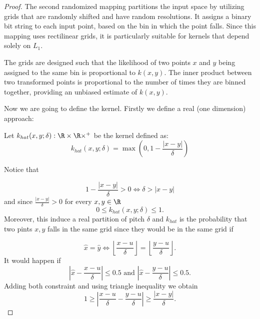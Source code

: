 \begin{proof}
The second randomized mapping partitions the input space by utilizing grids that are randomly shifted and have random resolutions. It assigns a binary bit string to each input point, based on the bin in which the point falls. Since this mapping uses rectilinear grids, it is particularly suitable for kernels that depend solely on $L_1$.

The grids are designed such that the likelihood of two points $x$ and $y$ being assigned to the same bin is proportional to $k(x,y)$. The inner product between two transformed points is proportional to the number of times they are binned together, providing an unbiased estimate of $k(x,y)$.


Now we are going to define the kernel. Firstly we define a real (one dimension) approach: 

Let  $k_{hat}(x, y; \delta) : \R \times \R \times ^+$ be the kernel defined as: 
\begin{equation}
    k_{hat}(x, y; \delta)
    = 
    \max 
    \left(
    0,
    1 - \frac{|x-y|}{\delta}
    \right)  
\end{equation}

Notice that 

\begin{equation}
    1 - \frac{|x-y|}{\delta} > 0
    \Leftrightarrow
    \delta > |x-y |
\end{equation}
and since $\frac{|x-y|}{\delta} > 0$ for every $x,y \in \R$
\begin{equation}
     0 \leq k_{hat}(x, y; \delta) \leq 1.
\end{equation} 
Moreover, this induce a real partition of pitch $\delta$ and $k_{hat}$ is the probability that two pints $x,y$ falls in the same grid since 
they would be in the same grid if 

\begin{equation}
 \hat{x} = \hat{y}
   \Leftrightarrow
        \left\lfloor
            \frac{x-u}{\delta}
        \right\rfloor
        = 
        \left\lfloor
        \frac{y-u}{\delta}
    \right\rfloor
.
\end{equation}
It would happen if
\begin{equation}
    \left| 
        \hat{x} - \frac{x-u}{\delta}
    \right|
    \leq 0.5
    \text{ and }
    \left| 
        \hat{x} - \frac{y-u}{\delta}
    \right|
    \leq 0.5.
\end{equation}
Adding both constraint and using triangle inequality we obtain 
\begin{equation}
    1 \geq \left| 
        \frac{x-u}{\delta} - \frac{y-u}{\delta}
    \right|
    \geq
        \frac{ |x-y|}{\delta}.
\end{equation}



\end{proof}
